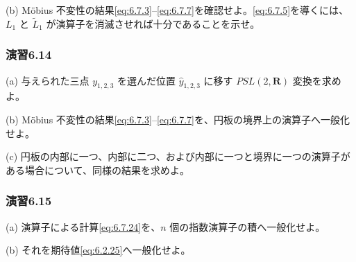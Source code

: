 (b) Möbius 不変性の結果\eqref{eq:6.7.3}--\eqref{eq:6.7.7}を確認せよ。\eqref{eq:6.7.5}を導くには、$L_1$ と $\widetilde L_1$ が演算子を消滅させれば十分であることを示せ。

\subsubsection*{演習6.14}\label{ex:6.14}
(a) 与えられた三点 $y_{1,2,3}$ を選んだ位置 $\widehat y_{1,2,3}$ に移す $PSL(2,\mathbf R)$ 変換を求めよ。

(b) Möbius 不変性の結果\eqref{eq:6.7.3}--\eqref{eq:6.7.7}を、円板の境界上の演算子へ一般化せよ。

(c) 円板の内部に一つ、内部に二つ、および内部に一つと境界に一つの演算子がある場合について、同様の結果を求めよ。

\subsubsection*{演習6.15}\label{ex:6.15}
(a) 演算子による計算\eqref{eq:6.7.24}を、$n$ 個の指数演算子の積へ一般化せよ。

(b) それを期待値\eqref{eq:6.2.25}へ一般化せよ。

